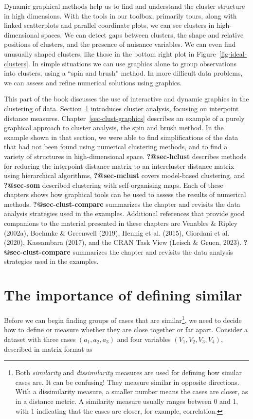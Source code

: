 \documentclass[
  letterpaper,
]{krantz}
\begin{document}
Dynamic graphical methods help us to find and understand the cluster
structure in high dimensions. With the tools in our toolbox, primarily
tours, along with linked scatterplots and parallel coordinate plots, we
can see clusters in high-dimensional spaces. We can detect gaps between
clusters, the shape and relative positions of clusters, and the presence
of nuisance variables. We can even find unusually shaped clusters, like
those in the bottom right plot in Figure~\ref{fig-ideal-clusters}. In
simple situations we can use graphics alone to group observations into
clusters, using a ``spin and brush'' method. In more difficult data
problems, we can assess and refine numerical solutions using
graphics.

This part of the book discusses the use of interactive and dynamic
graphics in the clustering of data. Section~\ref{sec-clust-bg}
introduces cluster analysis, focusing on interpoint distance measures.
Chapter~\ref{sec-clust-graphics} describes an example of a purely
graphical approach to cluster analysis, the spin and brush method. In
the example shown in that section, we were able to find simplifications
of the data that had not been found using numerical clustering methods,
and to find a variety of structures in high-dimensional space.
\textbf{?@sec-hclust} describes methods for reducing the interpoint
distance matrix to an intercluster distance matrix using hierarchical
algorithms, \textbf{?@sec-mclust} covers model-based clustering, and
\textbf{?@sec-som} described clustering with self-organising maps. Each
of these chapters shows how graphical tools can be used to assess the
results of numerical methods. \textbf{?@sec-clust-compare} summarizes
the chapter and revisits the data analysis strategies used in the
examples. Additional references that provide good companions to the
material presented in these chapters are Venables \& Ripley (2002a),
Boehmke \& Greenwell (2019), Hennig et al. (2015), Giordani et al.
(2020), Kassambara (2017), and the CRAN Task View (Leisch \& Gruen,
2023). \textbf{?@sec-clust-compare} summarizes the chapter and revisits
the data analysis strategies used in the examples.

\hypertarget{sec-clust-bg}{%
\section{The importance of defining similar}\label{sec-clust-bg}}

Before we can begin finding groups of cases that are similar\footnote{Both
  \emph{similarity} and \emph{dissimilarity} measures are used for
  defining how similar cases are. It can be confusing! They measure
  similar in opposite directions. With a dissimilarity measure, a
  smaller number means the cases are closer, as in a distance metric. A
  similarity measure usually ranges between 0 and 1, with 1 indicating
  that the cases are closer, for example, correlation.}, we need to
decide how to define or measure whether they are close together or far
apart. Consider a dataset with three cases \((a_1, a_2, a_3)\) and four
variables \((V_1, V_2, V_3, V_4)\), described in matrix format as
\end{document}
